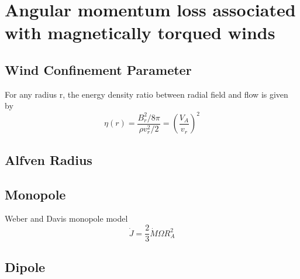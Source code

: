 \section{Angular momentum loss associated with magnetically torqued winds}
\subsection{Wind Confinement Parameter}
For any radius r, the energy density ratio between radial field and flow is given by
\begin{equation}
\eta(r)=\frac{B_r^2/8\pi}{\rho v_r^2/2}=(\frac{V_A}{v_r})^2
\end{equation}

\subsection{Alfven Radius}

\subsection{Monopole}
Weber and Davis monopole model
\begin{equation}
\dot{J}=\frac{2}{3}\dot{M}\Omega R_A^2
\end{equation}
\subsection{Dipole}